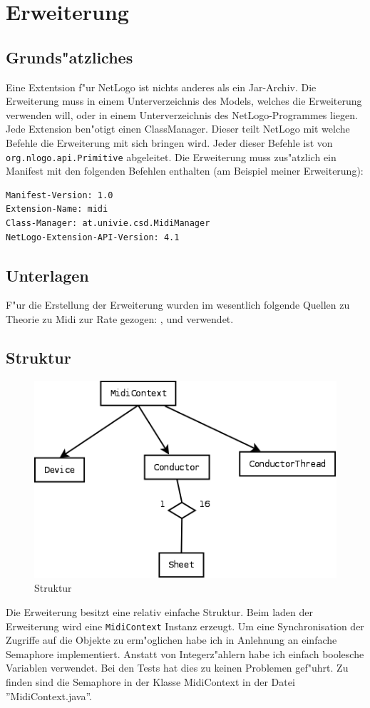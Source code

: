 \section{Erweiterung}
\subsection{Grunds"atzliches}
Eine Extentsion f"ur NetLogo ist nichts anderes als ein Jar-Archiv. Die Erweiterung
muss in einem Unterverzeichnis des Models, welches die Erweiterung verwenden will,
oder in einem Unterverzeichnis des NetLogo-Programmes liegen. Jede Extension
ben"otigt einen ClassManager. Dieser teilt NetLogo mit welche Befehle die 
Erweiterung mit sich bringen wird. 
\lstset{language=Java} Jeder dieser Befehle ist von \lstinline|org.nlogo.api.Primitive|
abgeleitet. Die Erweiterung muss zus"atzlich ein Manifest mit den folgenden 
Befehlen enthalten (am Beispiel meiner Erweiterung):
\begin{verbatim}
Manifest-Version: 1.0
Extension-Name: midi
Class-Manager: at.univie.csd.MidiManager
NetLogo-Extension-API-Version: 4.1
\end{verbatim}

\subsection{Unterlagen}
F"ur die Erstellung der Erweiterung wurden im wesentlich folgende Quellen 
zu Theorie zu Midi zur Rate gezogen: \cite{midi-inst}, \cite{midi-java} und
\cite{midi-javafaq} verwendet. 


\subsection{Struktur}
\begin{figure}[hbt]
	\centering
		\includegraphics[scale=0.5]{fig/struktur.png}
	\caption{Struktur}
	\label{fig:struktur}
\end{figure}
Die Erweiterung besitzt eine relativ einfache Struktur. Beim laden der Erweiterung
wird eine \lstinline|MidiContext| Instanz erzeugt. Um eine Synchronisation der
Zugriffe auf die Objekte zu erm"oglichen habe ich in Anlehnung an \cite{fh-wedel} 
einfache Semaphore implementiert. Anstatt von Integerz"ahlern habe ich einfach
boolesche Variablen verwendet. Bei den Tests hat dies zu keinen Problemen gef"uhrt.
Zu finden sind die Semaphore in der Klasse MidiContext in der Datei 
''MidiContext.java''. 

